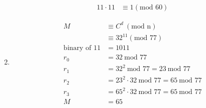 \documentclass{assignment}
\begin{document}
\begin{problemlist}
\begin{problem}
\begin{answer}
\begin{enumerate}[label=(\alph*)]
\begin{align*}
            11 \cdot 11 &\equiv 1 (\text{mod 60}) 
		  \end{align*}
	\item \begin{align*}
			M &\equiv C^d \: (\text{mod n}) \\
            &\equiv 32^{11}  (\text{mod 77}) \\
            \text{binary of 11} &= 1011 \\
            r_0 &= 32 \: \text{mod 77} \\ 
            r_1 &= 32^2 \: \text{mod 77} = 23 \: \text{mod 77} \\
            r_2 &= 23^2 \cdot 32  \: \text{mod 77} = 65 \: \text{mod 77} \\
            r_3 &= 65^2 \cdot 32  \: \text{mod 77} = 65 \: \text{mod 77} \\
            M &= 65
		  \end{align*}
\end{enumerate}

\end{answer}
\end{problem}

\end{problemlist}
\end{document}
